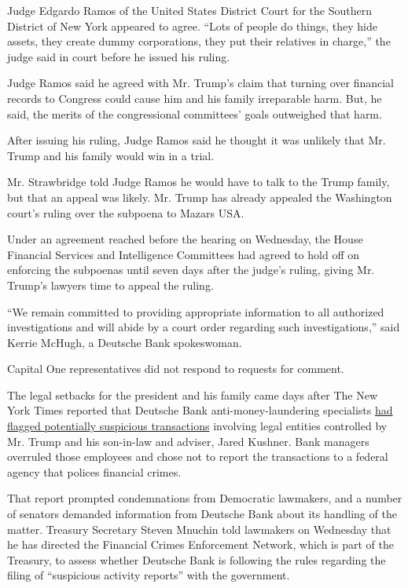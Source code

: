 Judge Edgardo Ramos of the United States District Court for the Southern
District of New York appeared to agree. ``Lots of people do things, they
hide assets, they create dummy corporations, they put their relatives in
charge,'' the judge said in court before he issued his ruling.

Judge Ramos said he agreed with Mr. Trump's claim that turning over
financial records to Congress could cause him and his family irreparable
harm. But, he said, the merits of the congressional committees' goals
outweighed that harm.

After issuing his ruling, Judge Ramos said he thought it was unlikely
that Mr. Trump and his family would win in a trial.

Mr. Strawbridge told Judge Ramos he would have to talk to the Trump
family, but that an appeal was likely. Mr. Trump has already appealed
the Washington court's ruling over the subpoena to Mazars USA.

Under an agreement reached before the hearing on Wednesday, the House
Financial Services and Intelligence Committees had agreed to hold off on
enforcing the subpoenas until seven days after the judge's ruling,
giving Mr. Trump's lawyers time to appeal the ruling.

``We remain committed to providing appropriate information to all
authorized investigations and will abide by a court order regarding such
investigations,'' said Kerrie McHugh, a Deutsche Bank spokeswoman.

Capital One representatives did not respond to requests for comment.

The legal setbacks for the president and his family came days after The
New York Times reported that Deutsche Bank anti-money-laundering
specialists
\href{https://www.nytimes.com/2019/05/19/business/deutsche-bank-trump-kushner.html}{had
flagged potentially suspicious transactions} involving legal entities
controlled by Mr. Trump and his son-in-law and adviser, Jared Kushner.
Bank managers overruled those employees and chose not to report the
transactions to a federal agency that polices financial crimes.

That report prompted condemnations from Democratic lawmakers, and a
number of senators demanded information from Deutsche Bank about its
handling of the matter. Treasury Secretary Steven Mnuchin told lawmakers
on Wednesday that he has directed the Financial Crimes Enforcement
Network, which is part of the Treasury, to assess whether Deutsche Bank
is following the rules regarding the filing of ``suspicious activity
reports'' with the government.

